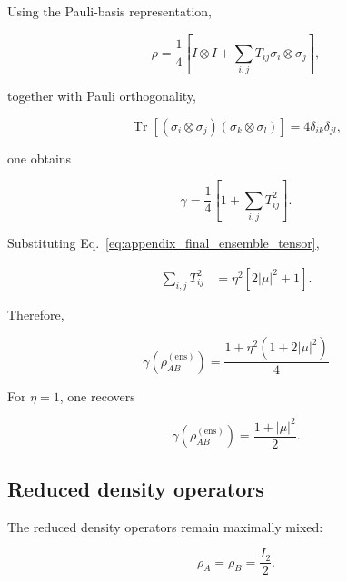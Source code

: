 Using the Pauli-basis representation,

\begin{equation}
\rho
=
\frac14
\left[
I\otimes I
+
\sum_{i,j}
T_{ij}
\sigma_i\otimes\sigma_j
\right],
\end{equation}

together with Pauli orthogonality,

\begin{equation}
\operatorname{Tr}
\left[
(\sigma_i\otimes\sigma_j)
(\sigma_k\otimes\sigma_l)
\right]
=
4
\delta_{ik}
\delta_{jl},
\end{equation}

one obtains

\begin{equation}
\gamma
=
\frac14
\left[
1
+
\sum_{i,j}
T_{ij}^2
\right].
\label{eq:appendix_purity_tensor_formula}
\end{equation}

Substituting Eq.~\eqref{eq:appendix_final_ensemble_tensor},

\begin{align}
\sum_{i,j}
T_{ij}^2
&=
\eta^2
\left[
2|\mu|^2
+
1
\right].
\end{align}

Therefore,

\begin{equation}
\boxed{
\gamma
\left(
\rho_{AB}^{(\mathrm{ens})}
\right)
=
\frac{
1+\eta^2(1+2|\mu|^2)
}{4}
}
\label{eq:appendix_ensemble_purity}
\end{equation}

\medskip

For \( \eta=1 \), one recovers

\begin{equation}
\gamma
\left(
\rho_{AB}^{(\mathrm{ens})}
\right)
=
\frac{1+|\mu|^2}{2}.
\label{eq:appendix_phase_ensemble_purity}
\end{equation}


\subsection*{Reduced density operators}

The reduced density operators remain maximally mixed:

\begin{equation}
\rho_A
=
\rho_B
=
\frac{I_2}{2}.
\end{equation}

